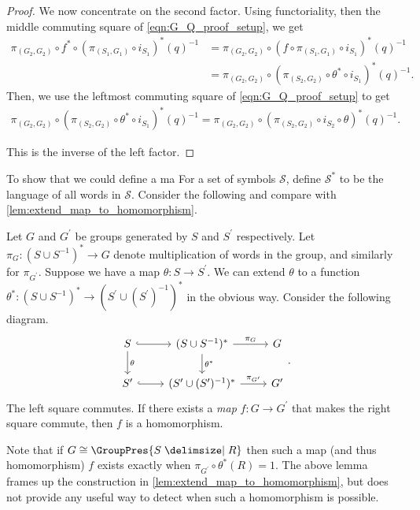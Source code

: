 \begin{proof}
	We now concentrate on the second factor. Using functoriality, then the middle commuting square of \eqref{eqn:G_Q_proof_setup}, we get
	\begin{align*}
		\pi_{(G_2,G_2)} \circ f^* \circ\left( \pi_{(S_1,G_1)} \circ i_{S_1}\right)^*(q)^{-1} &= \pi_{(G_2,G_2)} \circ \left( f \circ \pi_{(S_1,G_1)} \circ i_{S_1}\right)^*(q)^{-1}
												  \\ &= \pi_{(G_2,G_2)} \circ \left(\pi_{(S_2,G_2)} \circ \theta^* \circ i_{S_1}\right)^*(q)^{-1}.
	\end{align*}
	Then, we use the leftmost commuting square of \eqref{eqn:G_Q_proof_setup} to get
	\begin{align*}
		\pi_{(G_2,G_2)} \circ \left(\pi_{(S_2,G_2)} \circ \theta^* \circ i_{S_1}\right)^*(q)^{-1} = \pi_{(G_2,G_2)} \circ \left(\pi_{(S_2,G_2)} \circ i_{S_2} \circ \theta \right)^*(q)^{-1}.
	\end{align*}

	This is the inverse of the left factor.
	\end{proof}
To show that 
we could define a ma
For a set of symbols $\mathcal{S}$, define  $\mathcal{S}^*$ to be the language of all words in  $\mathcal{S}$.
Consider the following and compare with \cref{lem:extend_map_to_homomorphism}.

\begin{lemma}
	Let $G$ and $G^\prime$ be groups generated by $S$ and $S^\prime$ respectively.
	Let $\pi_G \colon (S \cup S^{-1})^* \to G$ denote multiplication of words in the group, and similarly for $\pi_{G^\prime}$.
	Suppose we have a map  $\theta \colon S \to S^\prime$.
	We can extend $\theta$ to a function $\theta^* \colon (S \cup S^{-1})^* \to (S^\prime \cup (S^\prime)^{-1})^*$ in the obvious way.
	Consider the following diagram.
	\[
		\begin{tikzcd}
			S \ar[d, "\theta"] \ar[r, hook] & (S \cup S^{-1})^* \ar[d, "\theta^*"] \ar[r, "\pi_G"] & G \\
			S^\prime \ar[r, hook] & (S^\prime \cup (S^\prime)^{-1})^* \ar[r, "\pi_{G^\prime}"] & G^\prime
		\end{tikzcd}
		.\]
	The left square commutes.
	If there exists a \emph{map} $f \colon G \to G^\prime$ that makes the right square commute, then $f$ is a homomorphism.
	\label{lem:homomorphism_squares}
\end{lemma}
\begin{remark}
	Note that if $G \cong \GroupPres{S \relations R}$ then such a map (and thus homomorphism) $f$ exists exactly when  $\pi_{G^\prime} \circ \theta^* (R) = 1$.
	The above lemma frames up the construction in \cref{lem:extend_map_to_homomorphism}, but does not provide any useful way to detect when such a homomorphism is possible.
	\label{rem:when_does_map_exist}
\end{remark}


